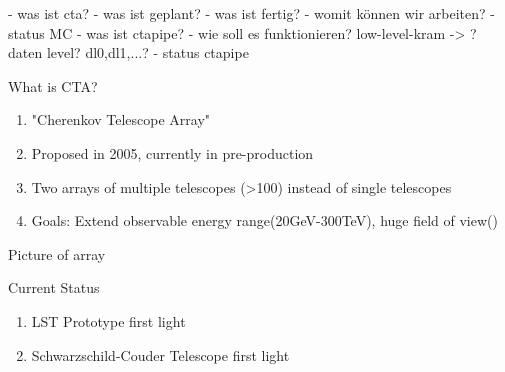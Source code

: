 \begin{frame}
    - was ist cta?
    - was ist geplant?
    - was ist fertig?
    - womit können wir arbeiten?
    - status MC
    - was ist ctapipe?
    - wie soll es funktionieren? low-level-kram -> ? daten level? dl0,dl1,...?
    - status ctapipe
\end{frame}

\begin{frame}{What is CTA?}
    \begin{enumerate}
        \item "Cherenkov Telescope Array"
        \item Proposed in 2005, currently in pre-production
        \item Two arrays of multiple telescopes (>100) instead of single telescopes
        \item Goals: Extend observable energy range(20GeV-300TeV), huge field of view()
    \end{enumerate}
\end{frame}

\begin{frame}{Picture of array}
    
\end{frame}

\begin{frame}{Current Status}
    \begin{enumerate}
        \item LST Prototype first light
        \item Schwarzschild-Couder Telescope first light
    \end{enumerate}
    
\end{frame}
